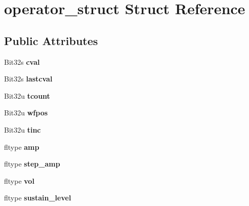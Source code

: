 \hypertarget{structoperator__struct}{\section{operator\-\_\-struct Struct Reference}
\label{structoperator__struct}
}
\subsection*{Public Attributes}
\begin{DoxyCompactItemize}
\item 
\hypertarget{structoperator__struct_a0c08bca216e6885ac706901d54cae7a8}{Bit32s {\bfseries cval}}\label{structoperator__struct_a0c08bca216e6885ac706901d54cae7a8}

\item 
\hypertarget{structoperator__struct_a06b00d4bda4186e0141064c04f35ff20}{Bit32s {\bfseries lastcval}}\label{structoperator__struct_a06b00d4bda4186e0141064c04f35ff20}

\item 
\hypertarget{structoperator__struct_adc017bf6c91d404433f48b286db544cc}{Bit32u {\bfseries tcount}}\label{structoperator__struct_adc017bf6c91d404433f48b286db544cc}

\item 
\hypertarget{structoperator__struct_a780a6e836f3f1a4672902a6eae265836}{Bit32u {\bfseries wfpos}}\label{structoperator__struct_a780a6e836f3f1a4672902a6eae265836}

\item 
\hypertarget{structoperator__struct_a7dad6587d798a8dada15cfe577957253}{Bit32u {\bfseries tinc}}\label{structoperator__struct_a7dad6587d798a8dada15cfe577957253}

\item 
\hypertarget{structoperator__struct_a4b89759371bed63d20ba9a7dd6439e44}{fltype {\bfseries amp}}\label{structoperator__struct_a4b89759371bed63d20ba9a7dd6439e44}

\item 
\hypertarget{structoperator__struct_af3e31c9622cfd31e2ee1dffb3db393f3}{fltype {\bfseries step\-\_\-amp}}\label{structoperator__struct_af3e31c9622cfd31e2ee1dffb3db393f3}

\item 
\hypertarget{structoperator__struct_aedf842922a5371822e643d7533d557e3}{fltype {\bfseries vol}}\label{structoperator__struct_aedf842922a5371822e643d7533d557e3}

\item 
\hypertarget{structoperator__struct_a3310acf676d3df01c8a6705797e07648}{fltype {\bfseries sustain\-\_\-level}}\label{structoperator__struct_a3310acf676d3df01c8a6705797e07648}


\end{DoxyCompactItemize}
